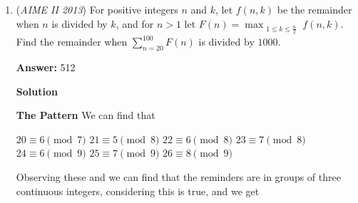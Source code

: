 \begin{enumerate}
 By the Law of Cosines on triangle $ABC,$
 \[\cos C = \frac{16y^2 + 16y^2 - 4x^2}{2 \cdot 4y \cdot 4y} = \frac{32y^2 - 4x^2}{32y^2} = \frac{8y^2 - x^2}{8y^2}.\]Then by the Law of Cosines on triangle $ACD,$\begin{align*}AD^2 &= 16y^2 + 9y^2 - 2 \cdot 4y \cdot 3y \cdot \cos C \\&= 25y^2 - 24y^2 \cdot \frac{8y^2 - x^2}{8y^2} \\&= 3x^2 + y^2.\end{align*}
Applying Stewart's Theorem to median $\overline{BE}$ in triangle $ABD,$ we get
 \[BE^2 + AE \cdot DE = \frac{AB^2 + BD^2}{2}.\]Thus,
 \[9 + \frac{3x^2 + y^2}{4} = \frac{4x^2 + y^2}{2}.\]This simplifies to $5x^2 + y^2 = 36.$

 Applying Stewart's Theorem to median $\overline{CE}$ in triangle $ACD,$ we get
 \[CE^2 + AE \cdot DE = \frac{AC^2 + CD^2}{2}.\]Thus,
 \[7 + \frac{3x^2 + y^2}{4} = \frac{16y^2 + 9y^2}{2}.\]This simplifies to $3x^2 + 28 = 49y^2.$

 Solving the system $5x^2 + y^2 = 36$ and $3x^2 + 28 = 49y^2,$ we find $x^2 = 7$ and $y^2 = 1,$ so $x = \sqrt{7}$ and $y = 1.$

 Plugging this back in for our equation for $\cos C$ gives us $\frac{1}{8}$, so $\sin C = \frac{3\sqrt{7}}{8}.$ We can apply the alternative area of a triangle formula, where $AC \cdot BC \cdot \sin C \cdot \frac{1}{2} = 3\sqrt{7}.$ Therefore, our answer is $\boxed{010}$.

 


 


 


	\item (\textit{AIME II 2013}) For positive integers $n$ and $k$, let $f(n, k)$ be the remainder when $n$ is divided by $k$, and for $n > 1$ let $F(n) = \max_{\substack{1\le k\le \frac{n}{2}}} f(n, k)$. Find the remainder when $\sum\limits_{n=20}^{100} F(n)$ is divided by $1000$.


 
 \textbf{Answer: }512



\textbf{Solution}

\textbf{The Pattern} We can find that 

 $20\equiv 6 \pmod{7}$
$21\equiv 5 \pmod{8}$
$22\equiv 6 \pmod{8}$
$23\equiv 7 \pmod{8}$
$24\equiv 6 \pmod{9}$
$25\equiv 7 \pmod{9}$
$26\equiv 8 \pmod{9}$

 Observing these and we can find that the reminders are in groups of three continuous integers, considering this is true, and we get


\end{enumerate}
